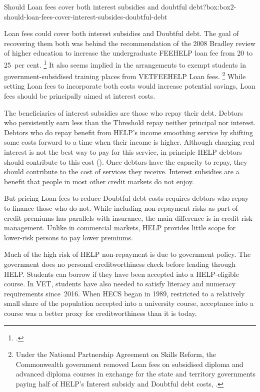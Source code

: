 \documentclass{grattan}
\begin{document}
\begin{bigbox*}{Should \gls{Loan fees} cover both interest subsidies and doubtful debt?}{box:box2-should-loan-fees-cover-interest-subsides-doubtful-debt}

\Gls{Loan fees} could cover both interest subsidies and \gls{Doubtful debt}.
The goal of recovering them both was behind the recommendation of the 2008 Bradley review of higher education to increase the undergraduate \gls{FEEHELP} loan fee from 20 to 25~per cent.%
\footcite[][167--168]{Bradley2008ReviewAustralianhigher}
It also seems implied in the arrangements to exempt students in government-subsidised training places from \gls{VETFEEHELP} \gls{Loan fees}.%
   \footnote{Under the National Partnership Agreement on Skills Reform, the Commonwealth government removed \gls{Loan fees} on subsidised diploma and advanced diploma courses in exchange for the state and territory governments paying half of \gls{HELP}'s \gls{Interest subsidy} and \gls{Doubtful debt} costs, \textcite[][25]{AustralianGovernments2012NationalPartnershipAgreement}.} While setting \gls{Loan fees} to incorporate both costs would increase potential savings, \gls{Loan fees} should be principally aimed at interest costs.

The beneficiaries of interest subsidies are those who repay their debt.
Debtors who persistently earn less than the \gls{Threshold} repay neither principal nor interest.
Debtors who do repay benefit from \gls{HELP}'s income smoothing service by shifting some costs forward to a time when their income is higher.
Although charging real interest is not the best way to pay for this service, in principle \gls{HELP} debtors should contribute to this cost ().
Once debtors have the capacity to repay, they should contribute to the cost of services they receive.
Interest subsidies are a benefit that people in most other credit markets do not enjoy.

But pricing \gls{Loan fees} to reduce \gls{Doubtful debt} costs requires debtors who repay to finance those who do not.
While including non-repayment risks as part of credit premiums has parallels with insurance, the main difference is in credit risk management.
Unlike in commercial markets, \gls{HELP} provides little scope for lower-risk persons to pay lower premiums.

Much of the high risk of \gls{HELP} non-repayment is due to government policy.
The government does no personal creditworthiness check before lending through \gls{HELP}\@.
Students can borrow if they have been accepted into a \gls{HELP}-eligible course.
In VET, students have also needed to satisfy literacy and numeracy requirements since~2016.
When \gls{HECS} began in 1989, restricted to a relatively small share of the population accepted into a university course, acceptance into a course was a better proxy for creditworthiness than it is today.


\end{bigbox*}
\end{document}
